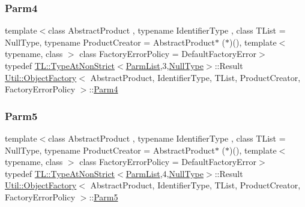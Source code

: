 \subsubsection{\texorpdfstring{Parm4}{Parm4}\hspace{0.1cm}{\footnotesize\ttfamily [3/3]}}
{\footnotesize\ttfamily template$<$class Abstract\+Product , typename Identifier\+Type , class T\+List  = Null\+Type, typename Product\+Creator  = Abstract\+Product$\ast$ ($\ast$)(), template$<$ typename, class $>$ class Factory\+Error\+Policy = Default\+Factory\+Error$>$ \\
typedef \mbox{\hyperlink{structUtil_1_1TL_1_1TypeAtNonStrict}{T\+L\+::\+Type\+At\+Non\+Strict}}$<$\mbox{\hyperlink{classUtil_1_1ObjectFactory_a46f003a5928e8a60140e0a74ac261c36}{Parm\+List}},3,\mbox{\hyperlink{classUtil_1_1NullType}{Null\+Type}}$>$\+::Result \mbox{\hyperlink{classUtil_1_1ObjectFactory}{Util\+::\+Object\+Factory}}$<$ Abstract\+Product, Identifier\+Type, T\+List, Product\+Creator, Factory\+Error\+Policy $>$\+::\mbox{\hyperlink{classUtil_1_1ObjectFactory_a052f09d9e81b11d98bb53a52f327cf01}{Parm4}}}

\mbox{\label{classUtil_1_1ObjectFactory_a11006cc1ea90957dd8e5604c2d9e069d}} 
\subsubsection{\texorpdfstring{Parm5}{Parm5}\hspace{0.1cm}{\footnotesize\ttfamily [1/3]}}
{\footnotesize\ttfamily template$<$class Abstract\+Product , typename Identifier\+Type , class T\+List  = Null\+Type, typename Product\+Creator  = Abstract\+Product$\ast$ ($\ast$)(), template$<$ typename, class $>$ class Factory\+Error\+Policy = Default\+Factory\+Error$>$ \\
typedef \mbox{\hyperlink{structUtil_1_1TL_1_1TypeAtNonStrict}{T\+L\+::\+Type\+At\+Non\+Strict}}$<$\mbox{\hyperlink{classUtil_1_1ObjectFactory_a46f003a5928e8a60140e0a74ac261c36}{Parm\+List}},4,\mbox{\hyperlink{classUtil_1_1NullType}{Null\+Type}}$>$\+::Result \mbox{\hyperlink{classUtil_1_1ObjectFactory}{Util\+::\+Object\+Factory}}$<$ Abstract\+Product, Identifier\+Type, T\+List, Product\+Creator, Factory\+Error\+Policy $>$\+::\mbox{\hyperlink{classUtil_1_1ObjectFactory_a11006cc1ea90957dd8e5604c2d9e069d}{Parm5}}}

